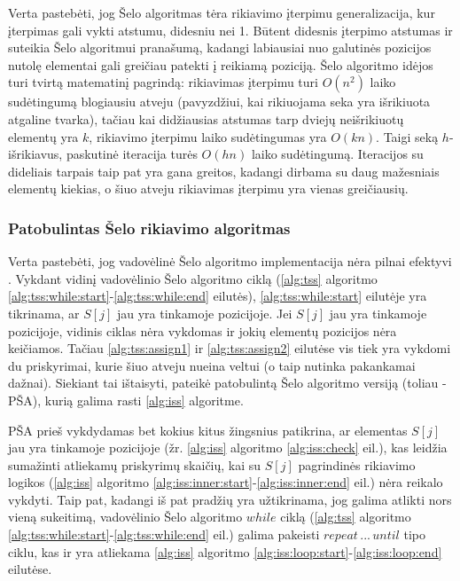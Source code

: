 \documentclass{VUMIFInfKursinis}
\begin{document}
Verta pastebėti, jog Šelo algoritmas tėra rikiavimo įterpimu generalizacija, kur įterpimas gali vykti atstumu, didesniu nei 1.
Būtent didesnis įterpimo atstumas ir suteikia Šelo algoritmui pranašumą, kadangi labiausiai nuo galutinės pozicijos nutolę elementai gali greičiau patekti į reikiamą poziciją.
Šelo algoritmo idėjos turi tvirtą matematinį pagrindą: rikiavimas įterpimu turi $O(n^2)$ laiko sudėtingumą blogiausiu atveju (pavyzdžiui, kai rikiuojama seka yra išrikiuota atgaline tvarka),
tačiau kai didžiausias atstumas tarp dviejų neišrikiuotų elementų yra $k$, rikiavimo įterpimu laiko sudėtingumas yra $O(kn)$.
Taigi seką $h$-išrikiavus, paskutinė iteracija turės $O(hn)$ laiko sudėtingumą.
Iteracijos su dideliais tarpais taip pat yra gana greitos, kadangi dirbama su daug mažesniais elementų kiekias,
o šiuo atveju rikiavimas įterpimu yra vienas greičiausių.

\subsubsection{Patobulintas Šelo rikiavimo algoritmas}

Verta pastebėti, jog vadovėlinė Šelo algoritmo implementacija nėra pilnai efektyvi \cite{Radavičius_Baranauskas_2013}.
Vykdant vidinį vadovėlinio Šelo algoritmo ciklą (\ref{alg:tss} algoritmo \ref{alg:tss:while:start}-\ref{alg:tss:while:end} eilutės),
\ref{alg:tss:while:start} eilutėje yra tikrinama, ar $S[j]$ jau yra tinkamoje pozicijoje.
Jei $S[j]$ jau yra tinkamoje pozicijoje, vidinis ciklas nėra vykdomas ir jokių elementų pozicijos nėra keičiamos.
Tačiau \ref{alg:tss:assign1} ir \ref{alg:tss:assign2} eilutėse vis tiek yra vykdomi du priskyrimai,
kurie šiuo atveju nueina veltui (o taip nutinka pakankamai dažnai).
Siekiant tai ištaisyti, \cite{Radavičius_Baranauskas_2013} pateikė patobulintą Šelo algoritmo versiją (toliau - PŠA),
kurią galima rasti \ref{alg:iss} algoritme.

PŠA prieš vykdydamas bet kokius kitus žingsnius patikrina, ar elementas $S[j]$ jau yra tinkamoje pozicijoje
(žr. \ref{alg:iss} algoritmo \ref{alg:iss:check} eil.), kas leidžia sumažinti atliekamų priskyrimų skaičių,
kai su $S[j]$ pagrindinės rikiavimo logikos (\ref{alg:iss} algoritmo \ref{alg:iss:inner:start}-\ref{alg:iss:inner:end} eil.) nėra reikalo vykdyti.
Taip pat, kadangi iš pat pradžių yra užtikrinama, jog galima atlikti nors vieną sukeitimą,
vadovėlinio Šelo algoritmo $while$ ciklą (\ref{alg:tss} algoritmo \ref{alg:tss:while:start}-\ref{alg:tss:while:end} eil.)
galima pakeisti $repeat\,...\,until$ tipo ciklu, kas ir yra atliekama \ref{alg:iss} algoritmo \ref{alg:iss:loop:start}-\ref{alg:iss:loop:end} eilutėse.
\end{document}
